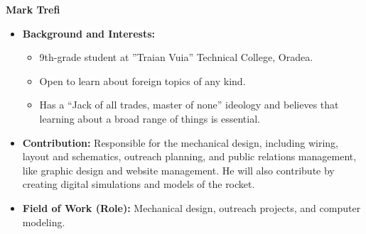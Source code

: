 \item[] \textbf{Mark Trefi}
    \begin{itemize}[label=]
        \item[\faGraduationCap] \textbf{Background and Interests:} 
        \begin{itemize}[label=\textbullet]
            \item 9th-grade student at ”Traian Vuia” Technical College, Oradea.
            \item Open to learn about foreign topics of any kind.
            \item Has a “Jack of all trades, master of none” ideology and believes that learning about a broad range of things is essential.
        \end{itemize}
        \item[\faEdit] \textbf{Contribution:} Responsible for the mechanical design, including wiring, layout and schematics, outreach planning, and public relations management, like graphic design and website management. He will also contribute by creating digital simulations and models of the rocket.
        \item[\faMicroscope] \textbf{Field of Work (Role):} Mechanical design, outreach projects, and computer modeling.
    \end{itemize}